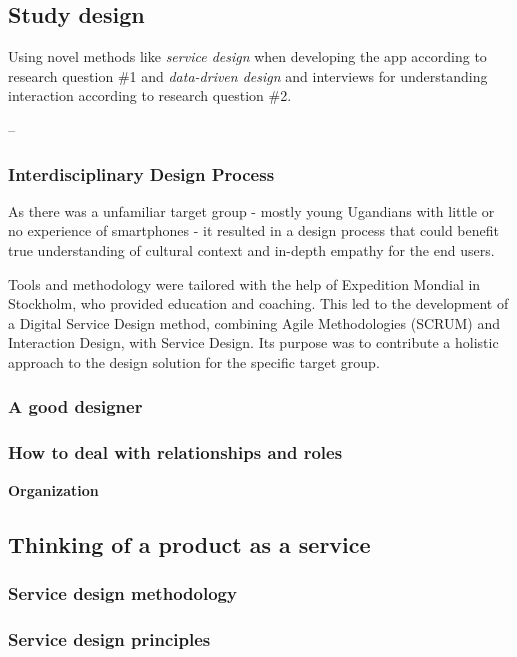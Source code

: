 \subsection{Study design}

Using novel methods like \textit{service design} when developing the app according to research question \#1 and \textit{data-driven design} and interviews for understanding interaction according to research question \#2.

--

\subsubsection{Interdisciplinary Design Process}

As there was a unfamiliar target group - mostly young Ugandians with little or no experience of smartphones - it resulted in a design process that could benefit true understanding of cultural context and in-depth empathy for the end users.

Tools and methodology were tailored with the help of Expedition Mondial in Stockholm, who provided education and coaching. This led to the development of a Digital Service Design method, combining Agile Methodologies (SCRUM) and Interaction Design, with Service Design. Its purpose was to contribute a holistic approach to the design solution for the specific target group. \cite{nissar-linkedin}

\subsubsection{A good designer}

\subsubsection{How to deal with relationships and roles}

\textbf{Organization}

\subsection{Thinking of a product as a service}

\subsubsection{Service design methodology}

\subsubsection{Service design principles}


